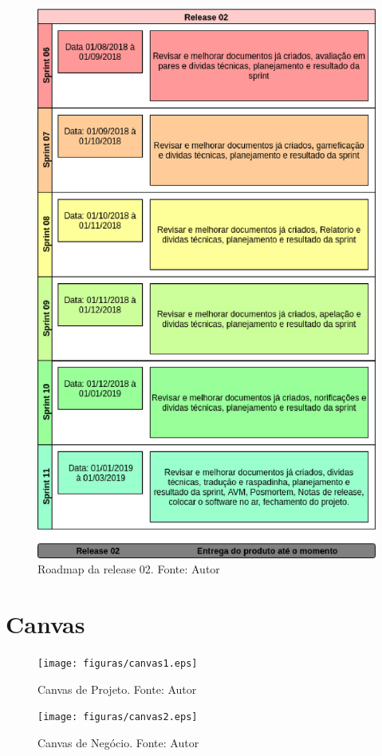 \begin{apendicesenv}
\begin{figure}[h!]
	\centering
  \includegraphics[keepaspectratio=true,scale=0.8]{figuras/roadmap2.eps}
  \caption[Roadmap da release 02]{Roadmap da release 02. Fonte: Autor}
	\label{fig:roadmap2}
\end{figure}

\chapter{Canvas} \label{apendice:canvas}

\begin{figure}[h!]
	\centering
  \texttt{[image: figuras/canvas1.eps]}
  \caption[Canvas de Projeto]{Canvas de Projeto. Fonte: Autor}
	\label{fig:canvas1}
\end{figure}

\begin{figure}[h!]
	\centering
  \texttt{[image: figuras/canvas2.eps]}
  \caption[Canvas de Negócio]{Canvas de Negócio. Fonte: Autor}
	\label{fig:canvas2}
\end{figure}

\end{apendicesenv}
